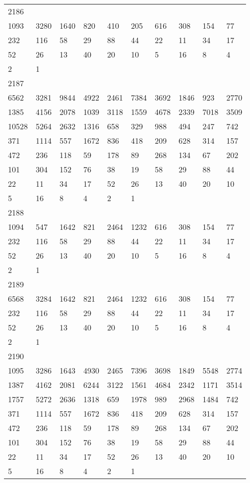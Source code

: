 \begin{longtable}{*{10}{l}}
2186&&&&&&&&&\\
1093& 3280& 1640& 820& 410& 205& 616& 308& 154& 77\\
232& 116& 58& 29& 88& 44& 22& 11& 34& 17\\
52& 26& 13& 40& 20& 10& 5& 16& 8& 4\\
2& 1& \\

2187&&&&&&&&&\\
6562& 3281& 9844& 4922& 2461& 7384& 3692& 1846& 923& 2770\\
1385& 4156& 2078& 1039& 3118& 1559& 4678& 2339& 7018& 3509\\
10528& 5264& 2632& 1316& 658& 329& 988& 494& 247& 742\\
371& 1114& 557& 1672& 836& 418& 209& 628& 314& 157\\
472& 236& 118& 59& 178& 89& 268& 134& 67& 202\\
101& 304& 152& 76& 38& 19& 58& 29& 88& 44\\
22& 11& 34& 17& 52& 26& 13& 40& 20& 10\\
5& 16& 8& 4& 2& 1& \\

2188&&&&&&&&&\\
1094& 547& 1642& 821& 2464& 1232& 616& 308& 154& 77\\
232& 116& 58& 29& 88& 44& 22& 11& 34& 17\\
52& 26& 13& 40& 20& 10& 5& 16& 8& 4\\
2& 1& \\

2189&&&&&&&&&\\
6568& 3284& 1642& 821& 2464& 1232& 616& 308& 154& 77\\
232& 116& 58& 29& 88& 44& 22& 11& 34& 17\\
52& 26& 13& 40& 20& 10& 5& 16& 8& 4\\
2& 1& \\

2190&&&&&&&&&\\
1095& 3286& 1643& 4930& 2465& 7396& 3698& 1849& 5548& 2774\\
1387& 4162& 2081& 6244& 3122& 1561& 4684& 2342& 1171& 3514\\
1757& 5272& 2636& 1318& 659& 1978& 989& 2968& 1484& 742\\
371& 1114& 557& 1672& 836& 418& 209& 628& 314& 157\\
472& 236& 118& 59& 178& 89& 268& 134& 67& 202\\
101& 304& 152& 76& 38& 19& 58& 29& 88& 44\\
22& 11& 34& 17& 52& 26& 13& 40& 20& 10\\
5& 16& 8& 4& 2& 1& \\


\end{longtable}
